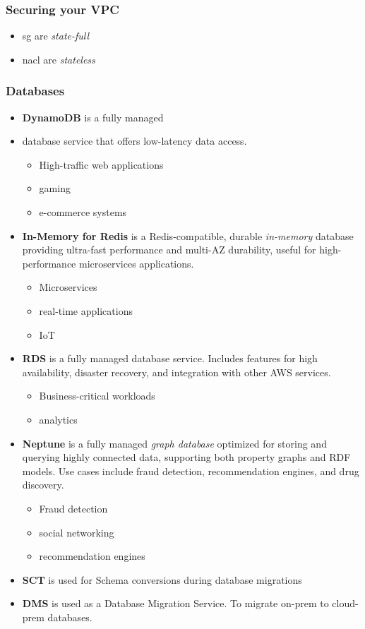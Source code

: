\subsubsection{Securing your VPC}

\begin{itemize}
    \item \Gls{sg} are \textit{state-full}
    \item \Gls {nacl} are \textit{stateless}
\end{itemize}

\subsubsection{Databases}

\begin{itemize}
    \item \textbf{DynamoDB} is a fully managed \item  database service that offers low-latency data access.
    \begin{itemize}
        \item High-traffic web applications
        \item gaming
        \item e-commerce systems
    \end{itemize}
    \item \textbf{In-Memory for Redis} is a Redis-compatible, durable \textit{in-memory }database providing ultra-fast performance and multi-AZ durability, useful for high-performance microservices applications.
    \begin{itemize}
        \item Microservices
        \item real-time applications
        \item IoT
    \end{itemize}
    \item \textbf{RDS} is a fully managed database service. Includes features for high availability, disaster recovery, and integration with other AWS services.
    \begin{itemize}
        \item Business-critical workloads
        \item analytics
    \end{itemize}
    \item \textbf{Neptune} is a fully managed \textit{graph database} optimized for storing and querying highly connected data, supporting both property graphs and RDF models. Use cases include fraud detection, recommendation engines, and drug discovery.
    \begin{itemize}
        \item Fraud detection
        \item social networking
        \item recommendation engines
    \end{itemize}
    \item \textbf{SCT} is used for Schema conversions during database migrations
    \item \textbf{DMS} is used as a Database Migration Service. To migrate on-prem to cloud-prem databases.
\end{itemize}

